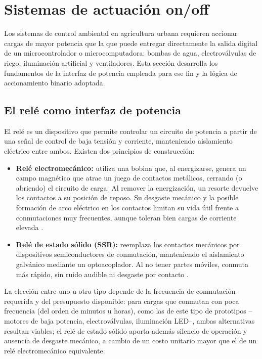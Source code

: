 \section{Sistemas de actuación on/off}
\label{sec:actuacion}

Los sistemas de control ambiental en agricultura urbana requieren accionar cargas de mayor potencia que la que puede entregar directamente la salida digital de un microcontrolador o microcomputadora: bombas de agua, electroválvulas de riego, iluminación artificial y ventiladores. Esta sección desarrolla los fundamentos de la interfaz de potencia empleada para ese fin y la lógica de accionamiento binario adoptada.

\subsection{El relé como interfaz de potencia}
\label{subsec:rele}

El relé es un dispositivo que permite controlar un circuito de potencia a partir de una señal de control de baja tensión y corriente, manteniendo aislamiento eléctrico entre ambos. Existen dos principios de construcción:

\begin{itemize}
    \item \textbf{Relé electromecánico:} utiliza una bobina que, al energizarse, genera un campo magnético que atrae un juego de contactos metálicos, cerrando (o abriendo) el circuito de carga. Al remover la energización, un resorte devuelve los contactos a su posición de reposo. Su desgaste mecánico y la posible formación de arco eléctrico en los contactos limitan su vida útil frente a conmutaciones muy frecuentes, aunque toleran bien cargas de corriente elevada \cite{rele_ssr_geya}.
    \item \textbf{Relé de estado sólido (SSR):} reemplaza los contactos mecánicos por dispositivos semiconductores de conmutación, manteniendo el aislamiento galvánico mediante un optoacoplador. Al no tener partes móviles, conmuta más rápido, sin ruido audible ni desgaste por contacto \cite{rele_ssr_geya}.
\end{itemize}

La elección entre uno u otro tipo depende de la frecuencia de conmutación requerida y del presupuesto disponible: para cargas que conmutan con poca frecuencia (del orden de minutos u horas), como las de este tipo de prototipos --motores de baja potencia, electroválvulas, iluminación LED--, ambas alternativas resultan viables; el relé de estado sólido aporta además silencio de operación y ausencia de desgaste mecánico, a cambio de un costo unitario mayor que el de un relé electromecánico equivalente.

